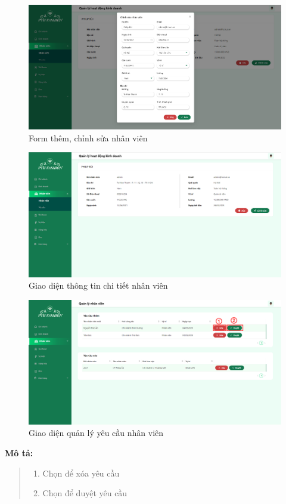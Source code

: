 \begin{figure}[!htp]
    \centering
    \includegraphics[width=12cm]{img/UI/admin_implement/staffEdit.png}
    \newline
    \caption{Form thêm, chỉnh sửa nhân viên}
\end{figure}


\begin{figure}[!htp]
    \centering
    \includegraphics[width=12cm]{img/UI/admin_implement/staffDetail.png}
    \newline
    \caption{Giao diện thông tin chi tiết nhân viên}
\end{figure}

\begin{figure}[!htp]
    \centering
    \includegraphics[width=12cm]{img/UI/admin_implement/staffRequest.png}
    \newline
    \caption{Giao diện quản lý yêu cầu nhân viên}
\end{figure}
\textbf{Mô tả:}
\begin{quote}
    \begin{enumerate}
        \item Chọn để xóa yêu cầu
        \item Chọn để duyệt yêu cầu
    \end{enumerate}
\end{quote}

